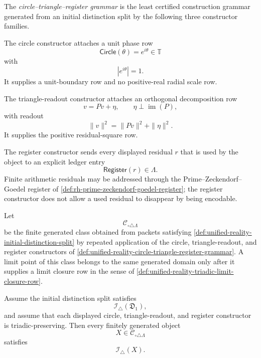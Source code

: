 \begin{definition}
\label{def:unified-reality-circle-triangle-register-grammar}
The \emph{circle--triangle--register grammar} is the least certified
construction grammar generated from an initial distinction split by the
following three constructor families.

The circle constructor attaches a unit phase row
$$
\mathsf{Circle}(\theta)=e^{i\theta}\in\mathbb T
$$
with
$$
|e^{i\theta}|=1.
$$
It supplies a unit-boundary row and no positive-real radial scale row.

The triangle-readout constructor attaches an orthogonal decomposition
row
$$
v=Pv+\eta,
\qquad
\eta\perp\operatorname{im}(P),
$$
with readout
$$
\|v\|^2
=
\|Pv\|^2+\|\eta\|^2.
$$
It supplies the positive residual-square row.

The register constructor sends every displayed residual $r$ that is used
by the object to an explicit ledger entry
$$
\mathsf{Register}(r)\in\Lambda.
$$
Finite arithmetic residuals may be addressed through the
Prime--Zeckendorf--Goedel register of
\autoref{def:rh-prime-zeckendorf-goedel-register}; the register
constructor does not allow a used residual to disappear by being
encodable.
\end{definition}

\begin{definition}
\label{def:unified-reality-circle-triangle-register-generated-class}
Let
$$
\mathcal C_{\circ\triangle\Lambda}
$$
be the finite generated class obtained from packets satisfying
\autoref{def:unified-reality-initial-distinction-split} by repeated
application of the circle, triangle-readout, and register constructors
of \autoref{def:unified-reality-circle-triangle-register-grammar}. A
limit point of this class belongs to the same generated domain only
after it supplies a limit closure row in the sense of
\autoref{def:unified-reality-triadic-limit-closure-row}.
\end{definition}

\begin{theorem}
\label{thm:unified-reality-circle-triangle-register-generation-induction}
Assume the initial distinction split satisfies
$$
\mathcal I_{\triangle}(\mathfrak D_1),
$$
and assume that each displayed circle, triangle-readout, and register
constructor is triadic-preserving. Then every finitely generated object
$$
X\in\mathcal C_{\circ\triangle\Lambda}
$$
satisfies
$$
\mathcal I_{\triangle}(X).
$$
\end{theorem}

